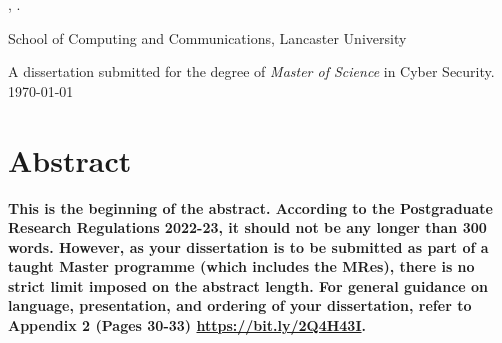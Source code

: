 \begin{center}
\textbf{\thesistitle}

\authorname, \authordegrees.

School of Computing and Communications, Lancaster University

A dissertation submitted for the degree of \textit{Master of Science} in Cyber Security.
\newline \monthyeardate\today
\end{center}

\section*{\centering Abstract} \vspace{12pt}

\textbf{This is the beginning of the abstract. According to the Postgraduate Research Regulations 2022-23, it should not be any longer than 300 words. However, as your dissertation is to be submitted as part of a taught Master programme (which includes the MRes), there is no strict limit imposed on the abstract length. For general guidance on language, presentation, and ordering of your dissertation, refer to Appendix 2 (Pages 30-33) \url{https://bit.ly/2Q4H43I}.}